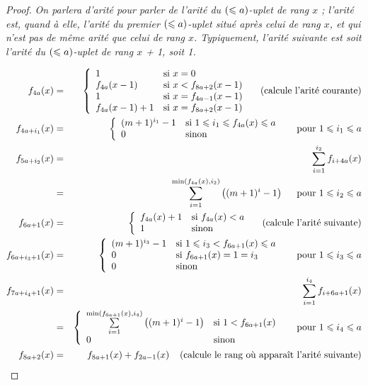 \begin{proof}
			\emph{On parlera d'arité  pour parler de l'arité du $\left( \leqslant a \right)$-uplet de rang $x$ ; l'arité  est, quand à elle, l'arité du premier $\left( \leqslant a \right)$-uplet situé après celui de rang $x$, et qui n'est pas de même arité que celui de rang $x$. Typiquement, l'arité suivante est soit l'arité du $\left( \leqslant a \right)$-uplet de rang $x$ + 1, soit 1. }
			
			\begin{eqnarray}
				f_{4a}(x) & = & \left\lbrace \begin{array}{ll} 
									1 & \text{si $x = 0$} \\
									f_{4a}(x-1) & \text{si $x < f_{8a+2}(x-1)$}\\
									1 & \text{si $x = f_{4a-1}(x-1)$} \\
									f_{4a}(x-1) + 1 & \text{si $x = f_{8a+2}(x-1)$} 
									 \end{array} \right. \label{eqn:f_4a_arite_courante} \:\:\:\:\: \text{(calcule l'arité courante)}\\
				f_{4a + i_1}(x) & = & \left\lbrace \begin{array}{ll} 
										(m+1)^{i_1} - 1 & \text{si $1 \leqslant i_1 \leqslant f_{4a}(x) \leqslant a$} \\
										0 & \text{sinon}
										 \end{array} \right. \label{eqn:max_1_pow_1}
										 \:\:\:\:\: \text{ pour $ 1 \leqslant i_1 \leqslant a $}\\
				f_{5a + i_2}(x) & = & \sum_{i=1}^{i_2} f_{i+4a}(x)\label{eqn:cumul_sum_max_1_pow_1} \\
					& = & \sum_{i=1}^{\min\left(f_{4a}(x), i_2\right)} \left((m+1)^{i} - 1\right) \nonumber
					 \:\:\:\:\: \text{ pour $ 1 \leqslant i_2 \leqslant a $}\\
				f_{6a +1}(x) & = & \left\lbrace \begin{array}{ll} 
										f_{4a}(x)+1 & \text{si $f_{4a}(x) < a$} \\
										1 	& \text{sinon}
										 \end{array} \right. \label{eqn:f_4a_arite_suivante}  \:\:\:\:\: \text{(calcule l'arité suivante)}\\
				f_{6a + i_3 + 1}(x) & = & \left\lbrace \begin{array}{ll} 
										(m+1)^{i_3} - 1 & \text{si $1 \leqslant i_3 < f_{6a +1}(x) \leqslant a$} \\
										0 & \text{si $f_{6a +1}(x)=1 = i_3$} \\
										0 & \text{sinon} 
										 \end{array} \right. \label{eqn:max_2_pow_1} \:\:\:\:\: \text{ pour $ 1 \leqslant i_3 \leqslant a $}\\
				f_{7a + i_4 + 1}(x) & = & \sum_{i=1}^{i_4} f_{i+6a+1}(x)\label{eqn:cumul_sum_max_2_pow_1} \\
					& = & \left\lbrace \begin{array}{ll} 
								\sum\limits_{i=1}^{\min\left(f_{6a+1}(x), i_4\right)} \left((m+1)^{i} - 1\right) & \text{si $1 < f_{6a +1}(x)$} \\
								0 & \text{sinon}
								 \end{array} \right. \nonumber  \:\:\:\:\: \text{ pour $ 1 \leqslant i_4 \leqslant a $} \\
				f_{8a + 2}(x) & = & f_{8a+1}(x) + f_{2a-1}(x) \label{eqn:rang_arite_suivante}   \:\:\:\:\: \text{(calcule le rang où apparaît l'arité suivante)}
			\end{eqnarray}
			

\end{proof}

